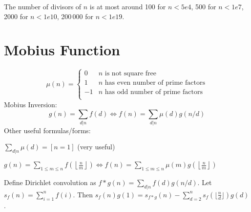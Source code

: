 	The number of divisors of $n$ is at most around 100 for $n < 5e4$, 500 for $n < 1e7$, 2000 for $n < 1e10$, 200\,000 for $n < 1e19$.

\section{Mobius Function}
\[
	\mu(n) = \begin{cases} 0 & n \textrm{ is not square free}\\ 1 & n \textrm{ has even number of prime factors}\\ -1 & n \textrm{ has odd number of prime factors}\\\end{cases}
\]
  Mobius Inversion:
  \[ g(n) = \sum_{d|n} f(d) \Leftrightarrow f(n) = \sum_{d|n} \mu(d)g(n/d) \]
  Other useful formulas/forms:

  $ \sum_{d | n} \mu(d) = [ n = 1] $ (very useful)

 $ g(n) = \sum_{1 \leq m \leq n} f(\left\lfloor\frac{n}{m}\right \rfloor ) \Leftrightarrow f(n) = \sum_{1\leq m\leq n} \mu(m)g(\left\lfloor\frac{n}{m}\right\rfloor)$

  Define Dirichlet convolution as $f * g(n) = \sum_{d|n}f(d)g(n/d)$.
  Let $s_f(n) = \sum_{i=1}^n{f(i)}$.
  Then $s_f(n)g(1) = s_{f*g}(n) - \sum^n_{d=2}s_f(\lfloor \frac{n}{d} \rfloor) g(d)$.
